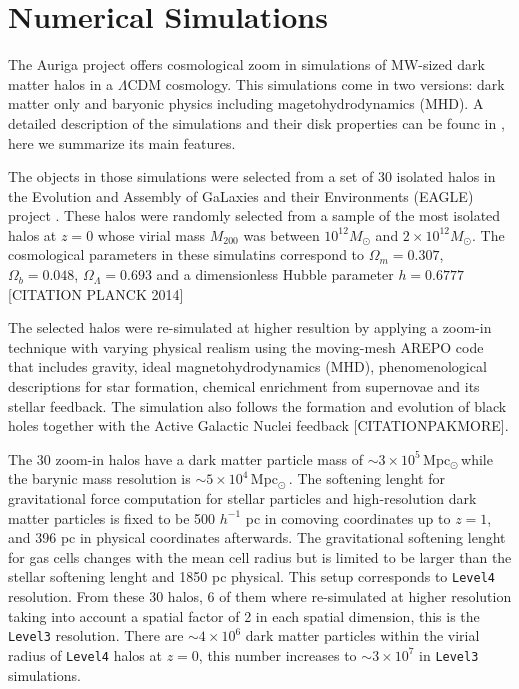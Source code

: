 \documentclass[a4paper,fleqn,usenatbib]{mnras}
\newcommand{\Msun}{\,{\rm Mpc}$_{\odot}$\,}
\begin{document}
\section{Numerical Simulations}


The Auriga project offers cosmological zoom in simulations of MW-sized 
dark matter halos in a $\Lambda$CDM cosmology. 
This simulations come in two versions: dark matter only and
baryonic physics including magetohydrodynamics (MHD).
A detailed description of the simulations and their
disk properties can be founc in \citep{auriga}, here we summarize its
main features.

The objects in those simulations were selected from a set of 30
isolated halos in the Evolution and Assembly of GaLaxies and their
Environments (EAGLE)  project \citep{Eagle}.   
These halos were randomly selected from a sample of the most isolated
halos at $z=0$ whose virial mass $M_{200}$ was between $10^{12}M_\odot$ and
$2\times 10^{12}M_\odot$. 
The cosmological parameters in these simulatins correspond to
$\Omega_m=0.307$, $\Omega_b=0.048$, $\Omega_\Lambda=0.693$ and a
dimensionless Hubble parameter $h=0.6777$ [CITATION PLANCK 2014]


The selected halos were re-simulated at higher resultion by applying a
zoom-in technique with varying physical realism using the moving-mesh AREPO code
that includes gravity, ideal magnetohydrodynamics (MHD), 
phenomenological descriptions for star formation, chemical enrichment
from supernovae and its stellar feedback.  The simulation also follows
the formation and evolution of black holes together with the Active
Galactic Nuclei feedback \citep{arepo} [CITATIONPAKMORE].  


The 30 zoom-in halos have a dark matter particle mass of $\sim 3\times
10^5$\Msun while the barynic mass resolution is $\sim 5\times 10^4$\Msun.
The softening lenght for gravitational force computation for stellar
particles and high-resolution dark matter particles 
is fixed to be 500 $h^{-1}$ pc in comoving coordinates up to $z=1$,
and 396 pc in physical coordinates afterwards.
The gravitational softening lenght for gas cells changes with the mean
cell radius but is limited to be larger than the stellar softening
lenght and 1850 pc physical. 
This setup corresponds to \texttt{Level4} resolution.
From these 30 halos, 6 of them where re-simulated at higher resolution
taking into account a spatial factor of 2 in each spatial dimension,
this is the \texttt{Level3} resolution.  
There are $\sim 4\times 10^6$ dark matter particles within the virial radius
of \texttt{Level4} halos at $z=0$, this number increases to $\sim 3\times 10^7$ in
\texttt{Level3} simulations. 
 
\end{document}

